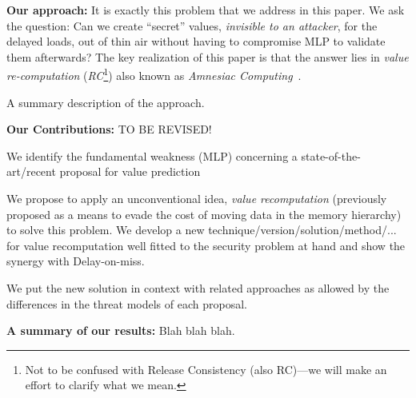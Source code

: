 \noindent \textbf{Our approach:} It is exactly this problem that we address in this paper. We ask the question: Can we create ``secret'' values, \emph{invisible to an attacker}, for the delayed loads, out of thin air without having to compromise MLP to validate them afterwards? The key realization of this paper is that the answer lies in \emph{value re-computation} (\emph{RC}\footnote{Not to be confused with Release Consistency (also RC)---we will make an effort to clarify what we mean.}) also known as \emph{Amnesiac Computing}~\cite{}.

A summary description of the approach.

\noindent \textbf{Our Contributions:} {\color{red} TO BE REVISED!}
\squishlist
\item We identify the fundamental weakness (MLP) concerning a state-of-the-art/recent proposal for value prediction 
\item We propose to apply an unconventional idea, \emph{value recomputation} (previously proposed as a means to evade the cost of moving data in the memory hierarchy) to solve this problem. We develop a new technique/version/solution/method/... for value recomputation well fitted to the security problem at hand and show the synergy with Delay-on-miss.
\item We put the new solution in context with related approaches as allowed by the differences in the threat models of each proposal.
\squishend

\noindent \textbf{A summary of our results:} Blah blah blah.






